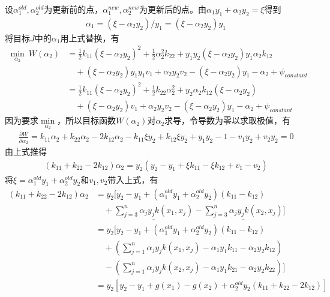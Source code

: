         \par
        设$\alpha_1^{old},\alpha_2^{old}$为更新前的点，$\alpha_1^{new},\alpha_2^{new}$为更新后的点。由$\alpha_1y_1+\alpha_2y_2 = \xi$得到
        \begin{align*}
        \alpha_1 = (\xi-\alpha_2y_2)/y_1 = (\xi-\alpha_2y_2)y_1
        \end{align*}
        将目标$J$中的$\alpha_1$用上式替换，有
        \begin{align*}
        \min_{\alpha_2} \ W(\alpha_2) &= \frac{1}{2}k_{11}(\xi -\alpha_2y_2)^2 + \frac{1}{2}\alpha_2^2k_{22}+y_1y_2(\xi -\alpha_2y_2)y_1\alpha_2k_{12}\\
        &\quad + (\xi-\alpha_2y_2)y_1y_1v_1+\alpha_2y_2v_2 - (\xi-\alpha_2y_2)y_1 - \alpha_2 +\psi_{constant}\\
        & =\frac{1}{2}k_{11}(\xi-\alpha_2y_2)^2+\frac{1}{2}k_{22}\alpha_2^2 +y_2\alpha_2k_{12}(\xi-\alpha_2y_2)\\
        &\quad+(\xi-\alpha_2y_2)v_1+\alpha_2y_2v_2-(\xi-\alpha_2y_2)y_1-\alpha_2+\psi_{constant}
        \end{align*}
        因为要求$\min\limits_{\alpha_2}$，所以目标函数$W(\alpha_2)$对$\alpha_2$求导，令导数为零以求取极值，有
        \begin{align*}
        \frac{\partial W}{\partial \alpha_2} = k_{11}\alpha_2 +k_{22}\alpha_2 - 2k_{12}\alpha_2 - k_{11}\xi y_2 +k_{12}\xi y_2+y_1y_2-1-v_1y_2+v_2y_2 = 0
        \end{align*}
        由上式推得
        \begin{align*}
        (k_{11}+k_{22}-2k_{12})\alpha_2 = y_2(y_2-y_1+\xi k_{11}-\xi k_{12}+v_1-v_2)
        \end{align*}
        将$\xi = \alpha_1^{old}y_1+\alpha_2^{old}y_2$和$v_1,v_2$带入上式，有
        \begin{align*}
        (k_{11}+k_{22}-2k_{12})\alpha_2 &= y_2 \Big[y_2-y_1 +(\alpha_1^{old}y_1+\alpha_2^{old}y_2)(k_{11}-k_{12}) \\
        &\quad +\underline{\sum_{j=3}^n \alpha_jy_jk(x_1,x_j)} - \underline{\sum_{j=3}^n\alpha_jy_jk(x_2,x_j)} \Big]\\
        &= y_2 \Bigg[y_2-y_1 +(\alpha_1^{old}y_1+\alpha_2^{old}y_2)(k_{11}-k_{12}) \\
        &\quad + \left( \sum_{j=1}^n \alpha_jy_jk(x_1,x_j) - \alpha_1y_1k_{11} - \alpha_2 y_2k_{12} \right) \\
        &\quad - \left( \sum_{j=1}^n \alpha_jy_jk(x_2,x_j) - \alpha_1y_1k_{21} - \alpha_2 y_2k_{22}  \right) \Bigg]\\
        & = y_2[y_2-y_1+g(x_1)-g(x_2)+\alpha_2^{old}y_2(k_{11}+k_{22}-2k_{12})]
        \end{align*}
